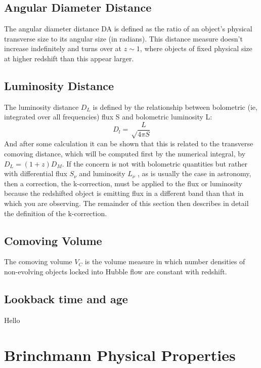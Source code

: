 \documentclass{literature}
\begin{document}
\subsection{Angular Diameter Distance}\label{subs:Angular Diameter distance}
The angular diameter distance DA is defined as the ratio of an object’s physical transverse size to its angular size (in radians). This distance measure doesn't increase indefinitely and turns over at $z \sim 1$, where objects of fixed physical size at higher redshift than this appear larger.
\subsection{Luminosity Distance}\label{subs:Luminosity distance}
The luminosity distance $D_{L}$ is defined by the relationship between bolometric (ie, integrated over all frequencies) flux S and bolometric luminosity L:
\begin{equation}
	D_{l} = \sqrt \frac{L}{4\pi S}
\end{equation}
And after some calculation it can be shown that this is related to the transverse comoving distance, which will be computed first by the numerical integral, by $D_{L} = (1 + z)D_{M}$. If the concern is not with bolometric quantities but rather with differential flux $S_{\nu}$ and luminosity $L_{\nu}$ , as is usually the case in astronomy, then a correction, the k-correction, must be applied to the flux or luminosity because the redshifted object is emitting flux in a different band than that in which you are observing. The remainder of this section then describes in detail the definition of the k-correction.

\subsection{Comoving Volume}\label{subs:Comoving Volume}
The comoving volume $V_{C}$ is the volume measure in which number densities of non-evolving objects locked into Hubble flow are constant with redshift.

\subsection{Lookback time and age}\label{subs:lookback time}
Hello



\section{Brinchmann Physical Properties}\label{sec:Brinchmann_properties}
\end{document}
